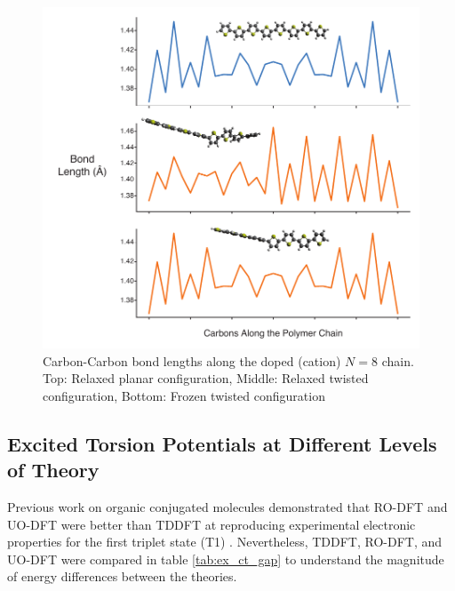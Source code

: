 \begin{figure}[hbt!]
    \centering
    \includegraphics{figures/append_tor_model/n8_fig_w.pdf}
    \caption[Polaron Localization in PT Chain (N = 8)]{Carbon-Carbon bond lengths along the doped (cation) $N = 8$ chain. Top: Relaxed planar configuration, Middle: Relaxed twisted configuration, Bottom: Frozen twisted configuration}
    \label{fig:n8_bl}
\end{figure}

\clearpage

\subsection{Excited Torsion Potentials at Different Levels of Theory}

Previous work on organic conjugated molecules demonstrated that RO-DFT and UO-DFT were better than TDDFT at reproducing experimental electronic properties for the first triplet state (T1) \cite{Hait2016}. Nevertheless, TDDFT, RO-DFT, and UO-DFT were compared in table \ref{tab:ex_ct_gap} to understand the magnitude of energy differences between the theories.

